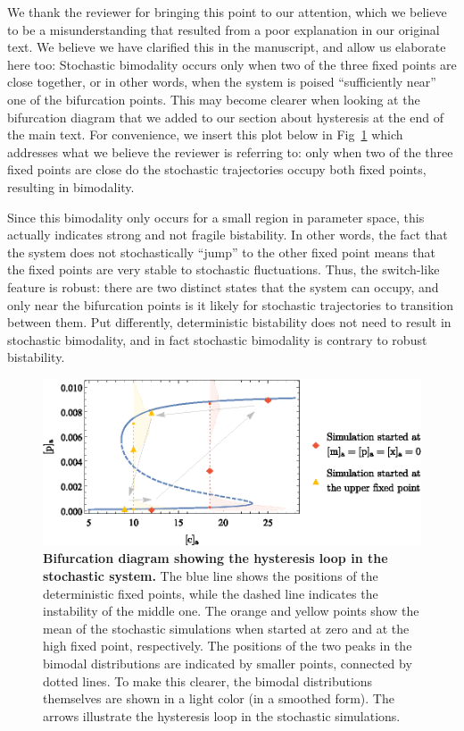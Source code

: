 \documentclass[11pt,letterpaper]{article}
\begin{document}
\begin{response}
We thank the reviewer for bringing this point to our attention, which we
believe to be a misunderstanding that resulted from a poor explanation
in our original text. We believe we have clarified this in the
manuscript, and allow us elaborate here too: Stochastic bimodality occurs
only when two of the three fixed points are close together, or in other
words, when the system is poised ``sufficiently near'' one of the
bifurcation points. This may become clearer when looking at the
bifurcation diagram that we added to our section about hysteresis at the
end of the main text. For convenience, we insert this plot below in
Fig~\ref{bifucation} which addresses what we believe the reviewer is
referring to: only when two of the three fixed points are close do the
stochastic trajectories occupy both fixed points, resulting in
bimodality.

Since this bimodality only occurs for a small region in parameter space,
this actually indicates strong and not fragile bistability. In other
words, the fact that the system does not stochastically ``jump'' to the
other fixed point means that the fixed points are very stable to
stochastic fluctuations. Thus, the switch-like feature is robust:
there are two distinct states that the system can occupy, and only near
the bifurcation points is it likely for stochastic trajectories to
transition between them. Put differently, deterministic bistability does
not need to result in stochastic bimodality, and in fact stochastic
bimodality is contrary to robust bistability.
\end{response}

\begin{figure}[h!]
	\centering
	\includegraphics{Fig10_bifurcation.eps}
	\caption{{\bf Bifurcation diagram showing the hysteresis loop in the stochastic system.}
		The blue line shows the positions of the deterministic fixed points, while the dashed line indicates the instability of the middle one. The orange and yellow points show the mean of the stochastic simulations when started at zero and at the high fixed point, respectively. The positions of the two peaks in the bimodal distributions are indicated by smaller points, connected by dotted lines. To make this clearer, the bimodal distributions themselves are shown in a light color (in a smoothed form). The arrows illustrate the hysteresis loop in the stochastic simulations.}
	\label{bifucation}
\end{figure}
\end{document}
